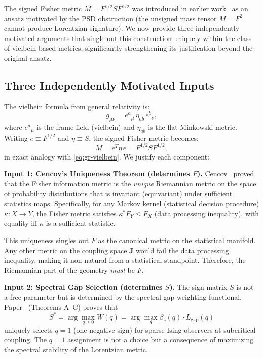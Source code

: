 \documentclass[11pt]{article}
\theoremstyle{definition}
\theoremstyle{remark}
\newcommand{\Fish}{F}
\newcommand{\sgn}{S}
\newcommand{\Met}{M}
\newcommand{\coupl}{\mathbf{J}}
\begin{document}
The signed Fisher metric $\Met = \Fish^{1/2}\sgn\Fish^{1/2}$ was
introduced in earlier work~\cite{Paper1,Paper5} as an ansatz motivated
by the PSD obstruction (the unsigned mass tensor $M = F^2$ cannot
produce Lorentzian signature). We now provide three independently
motivated arguments that single out this construction uniquely within
the class of vielbein-based metrics, significantly strengthening its
justification beyond the original ansatz.

\subsection{Three Independently Motivated Inputs}
\label{subsec:vielbein-inputs}

The vielbein formula from general relativity is:
\begin{equation}
  g_{\mu\nu} = e^a{}_\mu \, \eta_{ab} \, e^b{}_\nu,
  \label{eq:gr-vielbein}
\end{equation}
where $e^a{}_\mu$ is the frame field (vielbein) and $\eta_{ab}$ is
the flat Minkowski metric. Writing $e \equiv \Fish^{1/2}$ and
$\eta \equiv \sgn$, the signed Fisher metric becomes:
\begin{equation}
  \Met = e^T \eta\, e = \Fish^{1/2} \sgn \Fish^{1/2},
  \label{eq:vielbein-formula}
\end{equation}
in exact analogy with \eqref{eq:gr-vielbein}. We justify each component:

\medskip\noindent
\textbf{Input 1: Cencov's Uniqueness Theorem (determines $\Fish$).}
Cencov~\cite{Cencov1982} proved that the Fisher information metric is the
\emph{unique} Riemannian metric on the space of probability distributions
that is invariant (equivariant) under sufficient statistics maps.
Specifically, for any Markov kernel (statistical decision procedure)
$\kappa: X \to Y$, the Fisher metric satisfies
$\kappa^* \Fish_Y \leq \Fish_X$ (data processing inequality), with
equality iff $\kappa$ is a sufficient statistic.

This uniqueness singles out $\Fish$ as the canonical metric on the
statistical manifold. Any other metric on the coupling space $\coupl$
would fail the data processing inequality, making it non-natural from a
statistical standpoint. Therefore, the Riemannian part of the geometry
\emph{must} be $\Fish$.

\medskip\noindent
\textbf{Input 2: Spectral Gap Selection (determines $\sgn$).}
The sign matrix $\sgn$ is not a free parameter but is determined by the
spectral gap weighting functional. Paper~\cite{Paper5} (Theorems A--C)
proves that
\begin{equation}
  \sgn^* = \arg\max_{q \geq 0} W(q) = \arg\max_{q} \beta_c(q) \cdot L_{\mathrm{gap}}(q)
  \label{eq:sign-selection}
\end{equation}
uniquely selects $q = 1$ (one negative sign) for sparse Ising observers
at subcritical coupling. The $q = 1$ assignment is not a choice but
a consequence of maximizing the spectral stability of the Lorentzian
metric.
\end{document}
